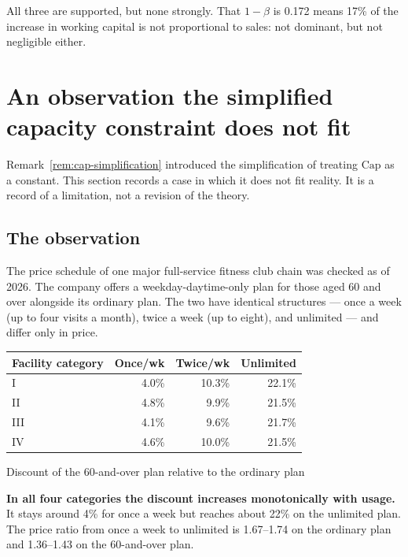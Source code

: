 All three are supported, but none strongly. That $1-\beta$ is 0.172 means 17\% of the increase in
working capital is not proportional to sales: not dominant, but not negligible either.

\section{An observation the simplified capacity constraint does not fit}
\label{sec:cap-observation}

Remark~\ref{rem:cap-simplification} introduced the simplification of treating $\mathrm{Cap}$ as a
constant. This section records a case in which it does not fit reality. It is a record of a
limitation, not a revision of the theory.

\subsection{The observation}

The price schedule of one major full-service fitness club chain was checked as of 2026. The
company offers a weekday-daytime-only plan for those aged 60 and over alongside its ordinary
plan. The two have identical structures — once a week (up to four visits a month), twice a week
(up to eight), and unlimited — and differ only in price.

\begin{center}
\begin{tabular}{@{}lrrr@{}}
\toprule
Facility category & Once/wk & Twice/wk & Unlimited \\
\midrule
I & 4.0\% & 10.3\% & 22.1\% \\
II & 4.8\% & 9.9\% & 21.5\% \\
III & 4.1\% & 9.6\% & 21.7\% \\
IV & 4.6\% & 10.0\% & 21.5\% \\
\bottomrule
\end{tabular}
\label{tab:senior-plan-discount}
\end{center}
\begin{center}\footnotesize Discount of the 60-and-over plan relative to the ordinary plan\end{center}

\textbf{In all four categories the discount increases monotonically with usage.} It stays around
4\% for once a week but reaches about 22\% on the unlimited plan. The price ratio from once a week
to unlimited is 1.67--1.74 on the ordinary plan and 1.36--1.43 on the 60-and-over plan.

